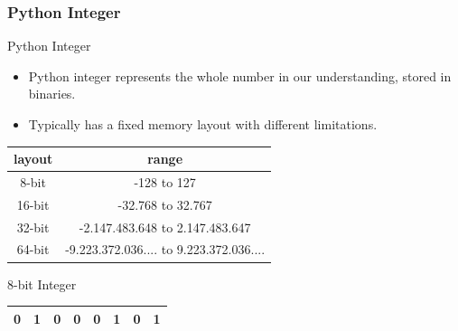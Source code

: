 \documentclass{beamer}
\begin{document}
    \begin{frame}[fragile]
        \frametitle{Python Integer}
        \begin{block}{Python Integer}
            \begin{itemize}
                \item Python integer represents the whole number in our understanding, stored in binaries.
                \item Typically has a fixed memory layout with different limitations.
            \end{itemize}
            \begin{center}
                \begin{tabular}{|c|c|}
                    \hline
                    \textbf{layout} & \textbf{range} \\
                    \hline
                    8-bit & -128 to 127 \\
                    16-bit & -32.768 to 32.767 \\
                    32-bit & -2.147.483.648 to 2.147.483.647 \\
                    64-bit & -9.223.372.036.... to 9.223.372.036.... \\
                    \hline
                \end{tabular}
            \end{center}
        \end{block}
        \begin{exampleblock}{8-bit Integer}
            \begin{center}
                \begin{tabular}{|c|c|c|c|c|c|c|c|}
                    \hline
                    0 & 1 & 0 & 0 & 0 & 1 & 0 & 1 \\
                    \hline
                \end{tabular}
            \end{center}
        \end{exampleblock}
    \end{frame}
\end{document}
